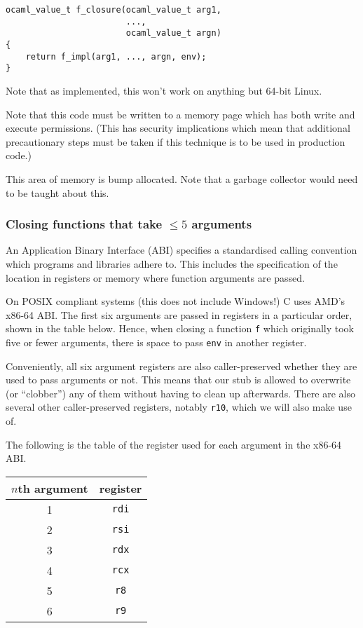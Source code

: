 \documentclass[12pt,a4paper,twoside,openright]{report}
\begin{document}
\begin{lstlisting}
ocaml_value_t f_closure(ocaml_value_t arg1,
                        ...,
                        ocaml_value_t argn)
{
    return f_impl(arg1, ..., argn, env);
}
\end{lstlisting}

Note that as implemented, this won't work on anything but 64-bit Linux.

Note that this code must be written to a memory page which has both write and
execute permissions. (This has security implications which mean that additional
precautionary steps must be taken if this technique is to be used in production
code.)

This area of memory is bump allocated. Note that a garbage collector would need
to be taught about this.

\subsubsection{Closing functions that take $\le 5$ arguments}

An Application Binary Interface (ABI) specifies a standardised calling
convention which programs and libraries adhere to. This includes the
specification of the location in registers or memory where function arguments
are passed.

On POSIX compliant systems (this does not include Windows!) C uses AMD's x86-64
ABI. The first six arguments are passed in registers in a particular order,
shown in the table below. Hence, when closing a function \lstinline!f! which
originally took five or fewer arguments, there is space to pass \lstinline!env!
in another register.

Conveniently, all six argument registers are also caller-preserved whether they
are used to pass arguments or not. This means that our stub is allowed to
overwrite (or ``clobber'') any of them without having to clean up afterwards.
There are also several other caller-preserved registers, notably
\lstinline!r10!, which we will also make use of.

The following is the table of the register used for each argument in the x86-64
ABI.

\begin{tabular}{ c | c }
  $n$th argument & register \\
  \hline
  1 & \lstinline!rdi! \\
  2 & \lstinline!rsi! \\
  3 & \lstinline!rdx! \\
  4 & \lstinline!rcx! \\
  5 & \lstinline!r8! \\
  6 & \lstinline!r9!
\end{tabular}
\end{document}
